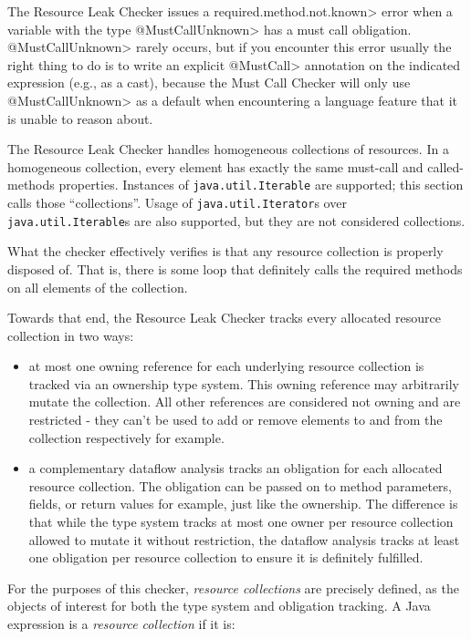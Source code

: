 The Resource Leak Checker issues a \<required.method.not.known> error
when a variable with the type \<@MustCallUnknown> has a must call obligation.
\<@MustCallUnknown> rarely occurs, but if you encounter this error usually
the right thing to do is to write an explicit \<@MustCall> annotation
on the indicated expression (e.g., as a cast), because the Must Call Checker
will only use \<@MustCallUnknown> as a default when encountering a language
feature that it is unable to reason about.


The Resource Leak Checker handles homogeneous collections of resources. In a homogeneous collection, every element
has exactly the same must-call and called-methods properties. Instances of \texttt{java.util.Iterable} are supported;
this section calls those ``collections''. Usage of \texttt{java.util.Iterator}s over \texttt{java.util.Iterable}s are also supported, but they are not considered collections.

What the checker effectively verifies is that any resource collection is properly disposed of. That is, there is some loop that definitely calls the required methods on all elements of the collection.

Towards that end, the Resource Leak Checker tracks every allocated resource collection in two ways:

\begin{itemize}
  \item at most one owning reference for each underlying resource collection is tracked via an ownership type system. This owning reference may arbitrarily mutate the collection. All other references are considered not owning and are restricted - they can't be used to add or remove elements to and from the collection respectively for example.
  \item a complementary dataflow analysis tracks an obligation for each allocated resource collection. The obligation can be passed on to method parameters, fields, or return values for example, just like the ownership. The difference is that while the type system tracks at most one owner per resource collection allowed to mutate it without restriction, the dataflow analysis tracks at least one obligation per resource collection to ensure it is definitely fulfilled.
\end{itemize}

For the purposes of this checker, \textit{resource collections} are precisely defined, as the objects of interest for both the type system and obligation tracking. A Java expression is a \textit{resource collection} if it is:

